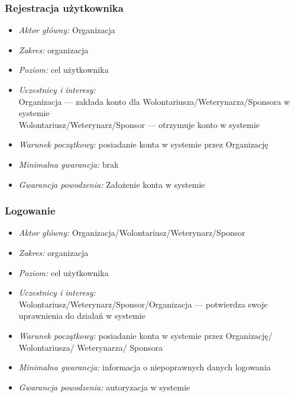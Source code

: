 \documentclass[10pt,a4paper]{article}
\begin{document}
\subsubsection{Rejestracja użytkownika}
\begin{itemize}
	\item \emph{Aktor główny:} Organizacja
	\item \emph{Zakres:} organizacja
	\item \emph{Poziom:} cel użytkownika
	\item \emph{Uczestnicy i interesy:} \\
		Organizacja --- zakłada konto dla Wolontariusza/Weterynarza/Sponsora w systemie\\
		Wolontariusz/Weterynarz/Sponsor --- otrzymuje konto w systemie
	\item \emph{Warunek początkowy:} posiadanie konta w systemie przez Organizację
	\item \emph{Minimalna gwarancja:} brak
	\item \emph{Gwarancja powodzenia:} Założenie konta w systemie
\end{itemize}

\subsubsection{Logowanie}
\begin{itemize}
	\item \emph{Aktor główny:} Organizacja/Wolontariusz/Weterynarz/Sponsor
	\item \emph{Zakres:} organizacja
	\item \emph{Poziom:} cel użytkownika
	\item \emph{Uczestnicy i interesy:} \\
		Wolontariusz/Weterynarz/Sponsor/Organizacja --- potwierdza swoje uprawnienia do działań w systemie
	\item \emph{Warunek początkowy:} posiadanie konta w systemie przez Organizację/ Wolontariusza/ Weterynarza/ Sponsora
	\item \emph{Minimalna gwarancja:} informacja o niepoprawnych danych logowania
	\item \emph{Gwarancja powodzenia:} autoryzacja w systemie
\end{itemize}
\end{document}
